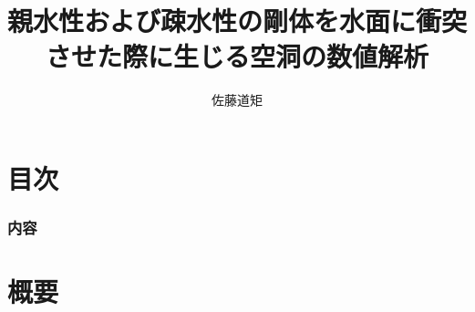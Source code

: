\documentclass[dvipdfmx,12pt]{beamer}
\title{親水性および疎水性の剛体を水面に衝突させた際に生じる空洞の数値解析}
\author{佐藤道矩}
\institute[京都大学大学院]{流体物理学研究室}
\begin{document}
\begin{frame}\frametitle{}
\titlepage
\end{frame}

\section*{目次}
\begin{frame}\frametitle{内容}
\tableofcontents
\end{frame}

\section{概要}
\end{document}
